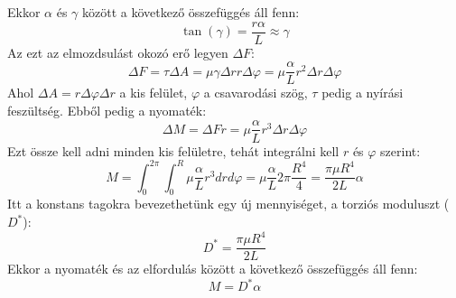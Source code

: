 \documentclass[../main.tex]{subfiles}
\begin{document}
Ekkor $\alpha$ és $\gamma$ között a következő összefüggés áll fenn:
\begin{equation}
    \tan(\gamma) = \frac{r \alpha}{L} \approx \gamma
\end{equation}
Az ezt az elmozdsulást okozó erő legyen $\Delta F$:
\begin{equation}
    \Delta F = \tau \Delta A = \mu \gamma \Delta r r \Delta \varphi = \mu \frac{\alpha}{L} r^2 \Delta r \Delta \varphi
\end{equation}
Ahol $\Delta A = r \Delta \varphi \Delta r$ a kis felület, $\varphi$ a csavarodási szög, $\tau$ pedig a nyírási feszültség. Ebből pedig a nyomaték:
\begin{equation}
    \Delta M = \Delta F r = \mu \frac{\alpha}{L} r^3 \Delta r \Delta \varphi
\end{equation}
Ezt össze kell adni minden kis felületre, tehát integrálni kell $r$ és $\varphi$ szerint:
\begin{equation}
    M = \int_0^{2\pi} \int_0^R \mu \frac{\alpha}{L} r^3 dr d\varphi = \mu \frac{\alpha}{L} 2 \pi \frac{R^4}{4} = \frac{\pi \mu R^4}{2L} \alpha
\end{equation}
Itt a konstans tagokra bevezethetünk egy új mennyiséget, a torziós moduluszt ($D^*$):
\begin{equation}
    D^* = \frac{\pi \mu R^4}{2L}
\end{equation}
Ekkor a nyomaték és az elfordulás között a következő összefüggés áll fenn:
\begin{equation}
    M = D^* \alpha
\end{equation}
\end{document}
